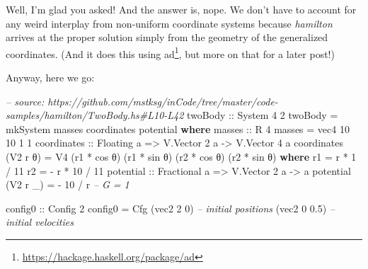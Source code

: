 \documentclass[]{article}
\newenvironment{Shaded}{}{}
\newcommand{\CommentTok}[1]{\textcolor[rgb]{0.38,0.63,0.69}{\textit{#1}}}
\newcommand{\DataTypeTok}[1]{\textcolor[rgb]{0.56,0.13,0.00}{#1}}
\newcommand{\DecValTok}[1]{\textcolor[rgb]{0.25,0.63,0.44}{#1}}
\newcommand{\FloatTok}[1]{\textcolor[rgb]{0.25,0.63,0.44}{#1}}
\newcommand{\FunctionTok}[1]{\textcolor[rgb]{0.02,0.16,0.49}{#1}}
\newcommand{\KeywordTok}[1]{\textcolor[rgb]{0.00,0.44,0.13}{\textbf{#1}}}
\newcommand{\NormalTok}[1]{#1}
\newcommand{\OtherTok}[1]{\textcolor[rgb]{0.00,0.44,0.13}{#1}}
\renewcommand{\href}[2]{#2\footnote{\url{#1}}}
\begin{document}
Well, I'm glad you asked! And the answer is, nope. We don't have to account for
any weird interplay from non-uniform coordinate systems because \emph{hamilton}
arrives at the proper solution simply from the geometry of the generalized
coordinates. (And it does this using
\href{https://hackage.haskell.org/package/ad}{ad}, but more on that for a later
post!)

Anyway, here we go:

\begin{Shaded}
\begin{Highlighting}[]
\CommentTok{-- source: https://github.com/mstksg/inCode/tree/master/code-samples/hamilton/TwoBody.hs#L10-L42}
\OtherTok{twoBody ::} \DataTypeTok{System} \DecValTok{4} \DecValTok{2}
\NormalTok{twoBody }\FunctionTok{=}\NormalTok{ mkSystem masses coordinates potential}
  \KeywordTok{where}
\OtherTok{    masses ::} \DataTypeTok{R} \DecValTok{4}
\NormalTok{    masses }\FunctionTok{=}\NormalTok{ vec4 }\DecValTok{10} \DecValTok{10} \DecValTok{1} \DecValTok{1}
\NormalTok{    coordinates}
\OtherTok{        ::} \DataTypeTok{Floating}\NormalTok{ a}
        \OtherTok{=>} \DataTypeTok{V.Vector} \DecValTok{2}\NormalTok{ a}
        \OtherTok{->} \DataTypeTok{V.Vector} \DecValTok{4}\NormalTok{ a}
\NormalTok{    coordinates (}\DataTypeTok{V2}\NormalTok{ r θ) }\FunctionTok{=} \DataTypeTok{V4}\NormalTok{ (r1 }\FunctionTok{*}\NormalTok{ cos θ) (r1 }\FunctionTok{*}\NormalTok{ sin θ)}
\NormalTok{                              (r2 }\FunctionTok{*}\NormalTok{ cos θ) (r2 }\FunctionTok{*}\NormalTok{ sin θ)}
      \KeywordTok{where}
\NormalTok{        r1 }\FunctionTok{=}\NormalTok{   r }\FunctionTok{*}  \DecValTok{1} \FunctionTok{/} \DecValTok{11}
\NormalTok{        r2 }\FunctionTok{=} \FunctionTok{-}\NormalTok{ r }\FunctionTok{*} \DecValTok{10} \FunctionTok{/} \DecValTok{11}
\NormalTok{    potential}
\OtherTok{        ::} \DataTypeTok{Fractional}\NormalTok{ a}
        \OtherTok{=>} \DataTypeTok{V.Vector} \DecValTok{2}\NormalTok{ a}
        \OtherTok{->}\NormalTok{ a}
\NormalTok{    potential (}\DataTypeTok{V2}\NormalTok{ r _) }\FunctionTok{=} \FunctionTok{-} \DecValTok{10} \FunctionTok{/}\NormalTok{ r       }\CommentTok{-- G = 1}

\OtherTok{config0 ::} \DataTypeTok{Config} \DecValTok{2}
\NormalTok{config0 }\FunctionTok{=} \DataTypeTok{Cfg}\NormalTok{ (vec2 }\DecValTok{2}   \DecValTok{0}\NormalTok{)  }\CommentTok{-- initial positions}
\NormalTok{              (vec2 }\DecValTok{0} \FloatTok{0.5}\NormalTok{)  }\CommentTok{-- initial velocities}
\end{Highlighting}
\end{Shaded}
\end{document}
